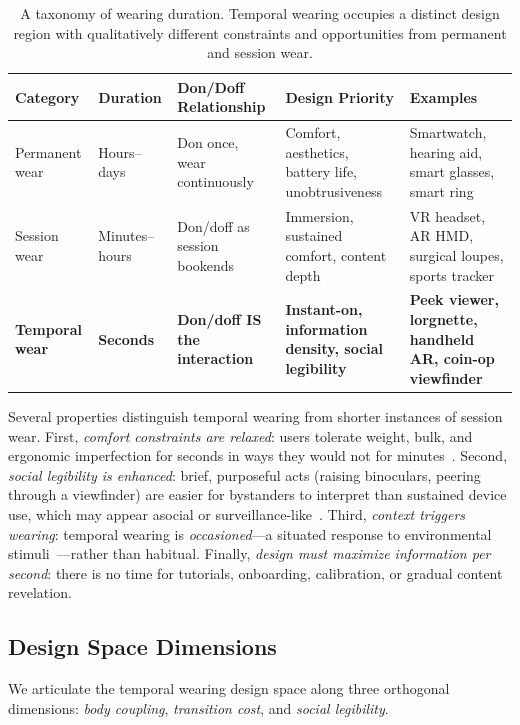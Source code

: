 \begin{table}[t]
\centering
\caption{A taxonomy of wearing duration. Temporal wearing occupies a distinct design region with qualitatively different constraints and opportunities from permanent and session wear.}
\label{tab:duration-taxonomy}
\begin{tabular}{p{2.2cm} p{1.8cm} p{3.2cm} p{3.5cm} p{3.8cm}}
\toprule
\textbf{Category} & \textbf{Duration} & \textbf{Don/Doff Relationship} & \textbf{Design Priority} & \textbf{Examples} \\
\midrule
Permanent wear & Hours--days & Don once, wear continuously & Comfort, aesthetics, battery life, unobtrusiveness & Smartwatch, hearing aid, smart glasses, smart ring \\
\addlinespace
Session wear & Minutes--hours & Don/doff as session bookends & Immersion, sustained comfort, content depth & VR headset, AR HMD, surgical loupes, sports tracker \\
\addlinespace
\textbf{Temporal wear} & \textbf{Seconds} & \textbf{Don/doff IS the interaction} & \textbf{Instant-on, information density, social legibility} & \textbf{Peek viewer, lorgnette, handheld AR, coin-op viewfinder} \\
\bottomrule
\end{tabular}
\end{table}

Several properties distinguish temporal wearing from shorter instances of session wear. First, \textit{comfort constraints are relaxed}: users tolerate weight, bulk, and ergonomic imperfection for seconds in ways they would not for minutes~\cite{park2019comfort}. Second, \textit{social legibility is enhanced}: brief, purposeful acts (raising binoculars, peering through a viewfinder) are easier for bystanders to interpret than sustained device use, which may appear asocial or surveillance-like~\cite{koelle2020social}. Third, \textit{context triggers wearing}: temporal wearing is \textit{occasioned}---a situated response to environmental stimuli~\cite{suchman2007humanmachine}---rather than habitual. Finally, \textit{design must maximize information per second}: there is no time for tutorials, onboarding, calibration, or gradual content revelation.


\subsection{Design Space Dimensions}

We articulate the temporal wearing design space along three orthogonal dimensions: \textit{body coupling}, \textit{transition cost}, and \textit{social legibility}.

